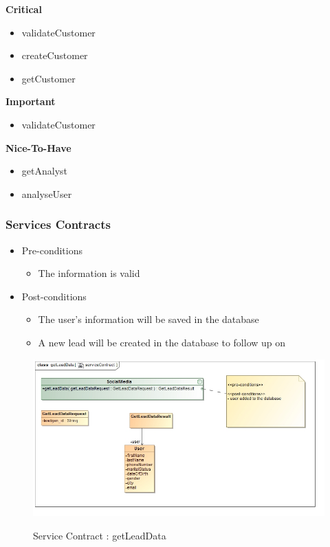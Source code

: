 \documentclass{article}
\begin{document}
		\begin{flushleft}
			\textbf{Critical}
				\begin{itemize}
	  				\item validateCustomer
	  				\item createCustomer
	  				\item getCustomer
				\end{itemize}
			\textbf{Important}
				\begin{itemize}
	  				\item validateCustomer
				\end{itemize}
			\textbf{Nice-To-Have}
				\begin{itemize}
	  				\item getAnalyst
	  				\item analyseUser
				\end{itemize}
		\end{flushleft}

		\subsubsection{Services Contracts}
		\begin{itemize}
			\item Pre-conditions
				\begin{itemize}
					\item The information is valid
				\end{itemize}
			\item Post-conditions
				\begin{itemize}
					\item The user's information will be saved in the database
					\item A new lead will be created in the database to follow up on
				\end{itemize}
		\end{itemize}
		\begin{figure}[H]
		\includegraphics[width=\textwidth]{images/class__getLeadData__serviceContract.jpg}  \\
		\caption{Service Contract : getLeadData}
		\end{figure}
\end{document}
